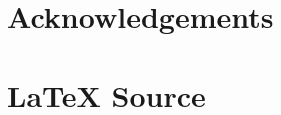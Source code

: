 \documentclass[11pt, oneside]{article}
\theoremstyle{definition}
\begin{document}
\bigskip
\bigskip
%
%
%
\section*{Acknowledgements}
%
%
\section*{\LaTeX \hspace{0.10 mm} Source}
%
%
%


%
%
\end{document}

